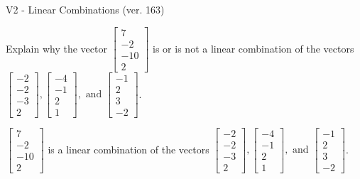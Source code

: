 \begin{exercise}
  \begin{exerciseTitle}V2 - Linear Combinations (ver. 163)\end{exerciseTitle}
  \begin{exerciseStatement}
    Explain why the vector \(\left[\begin{array}{c}
7 \\
-2 \\
-10 \\
2
\end{array}\right]\)  is or is not a linear 
	combination of the vectors \(\left[\begin{array}{c}
-2 \\
-2 \\
-3 \\
2
\end{array}\right] , \left[\begin{array}{c}
-4 \\
-1 \\
2 \\
1
\end{array}\right] , \text{ and } \left[\begin{array}{c}
-1 \\
2 \\
3 \\
-2
\end{array}\right]\).
	


  \end{exerciseStatement}
  \begin{exerciseAnswer}
   \(\left[\begin{array}{c}
7 \\
-2 \\
-10 \\
2
\end{array}\right]\) 
  	 is  
	a linear combination of the vectors \(\left[\begin{array}{c}
-2 \\
-2 \\
-3 \\
2
\end{array}\right] , \left[\begin{array}{c}
-4 \\
-1 \\
2 \\
1
\end{array}\right] , \text{ and } \left[\begin{array}{c}
-1 \\
2 \\
3 \\
-2
\end{array}\right]\).

	
  


  \end{exerciseAnswer}
\end{exercise}